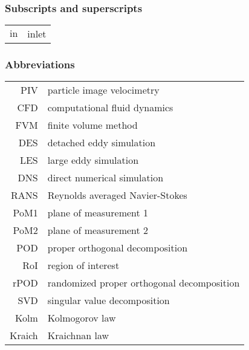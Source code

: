 \subsubsection*{Subscripts and superscripts}
\begin{tabular}{ rl}
$\mathrm{in}$ & inlet \\

\end{tabular}

\subsubsection*{Abbreviations}
\begin{tabular}{ rl}
PIV & particle image velocimetry \\
CFD & computational fluid dynamics \\
FVM & finite volume method \\
DES & detached eddy simulation \\
LES & large eddy simulation \\
DNS & direct numerical simulation \\
RANS & Reynolds averaged Navier-Stokes \\
PoM1 & plane of measurement 1 \\
PoM2 & plane of measurement 2 \\
POD & proper orthogonal decomposition \\
RoI & {region of interest} \\
rPOD & randomized proper orthogonal decomposition \\
SVD & singular value decomposition \\
Kolm & Kolmogorov law \\
Kraich & Kraichnan law \\


\end{tabular}

